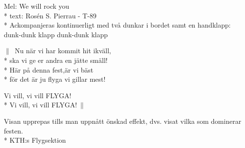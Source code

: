 \begin{SongText}
    \begin{SongInfo}
        Mel: We will rock you\\*%
        text: Rosén S. Pierrau - T-89\\*%
        Ackompanjeras kontinuerligt med två dunkar i bordet samt en handklapp: dunk-dunk klapp dunk-dunk klapp
    \end{SongInfo}
    \begin{SongVerse}
        $\|\:$ Nu när vi har kommit hit ikväll,\\*%
        ska vi ge er andra en jätte smäll!\\*%
        Här på denna fest,är vi bäst\\*%
        för det är ju flyga vi gillar mest!
    \end{SongVerse}
    \begin{SongVerse}
        Vi vill, vi vill FLYGA!\\*%
        Vi vill, vi vill FLYGA!$\:\|$
    \end{SongVerse}
    \begin{SongInfo}
        Visan upprepas tills man uppnått önskad effekt, dvs. visat vilka som dominerar festen.\\*%
        KTH:s Flygsektion
    \end{SongInfo}
\end{SongText}
